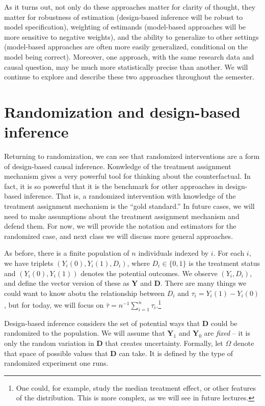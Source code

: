 \documentclass{tufte-handout}
\theoremstyle{break}
\newcommand{\bY}{\mathbf{Y}}
\newcommand{\bD}{\mathbf{D}}
\begin{document}
As it turns out, not only do these approaches matter for clarity of thought, they matter for robustness of estimation (design-based inference will be robust to model specification), weighting of estimands (model-based approaches will be more sensitive to negative weights), and the ability to generalize to other settings (model-based approaches are often more easily generalized, conditional on the model being correct). Moreover, one approach, with the same research data and causal question, may be much more statistically precise than another. We will continue to explore and describe these two approaches throughout the semester.


\section{Randomization and design-based inference}
Returning to randomization,  we can see that randomized interventions are a form of design-based causal inference. Konwledge of the treatment assignment mechanism gives a very powerful tool for thinking about the counterfactual. In fact, it is so powerful that it is the benchmark for other approaches in design-based inference. That is, a randomized intervention with knowledge of the treatment assignment mechanism is the ``gold standard.'' In future cases, we will need to make assumptions about the treatment assignment mechanism and defend them. For now, we will provide the notation and estimators for the randomized case, and next class we will discuss more general approaches.

As before, there is a finite population of $n$ individuals indexed by $i$. For each $i$, we have triplets $(Y_{i}(0), Y_{i}(1), D_{i})$,  where   $D_{i} \in \{0,1\}$  is the treatment status and $(Y_{i}(0), Y_{i}(1))$ denotes the potential outcomes. We observe $(Y_{i}, D_{i})$, and define the vector version of these as $\bY$ and $\bD$.  There are many things we could want to know abotu the relationship between $D_{i}$ and $\tau_{i} = Y_{i}(1) - Y_{i}(0)$, but for today, we will focus on $\bar{\tau} = n^{-1}\sum_{i=1}^{n}\tau_{i}.$\footnote{One could, for example, study the median treatment effect, or other features of the distribution. This is more complex, as we will see in future lectures.}

Design-based inference considers the set of potential ways that $\mathbf{D}$ could be randomized to the population. We will assume that $\mathbf{Y}_{1}$ and $\mathbf{Y}_0$ are \emph{fixed} -- it is only the random variation in $\mathbf{D}$ that creates uncertainty. Formally, let $\Omega$ denote that space of possible values that $\mathbf{D}$ can take. It is defined by the type of randomized experiment one runs.
\end{document}
